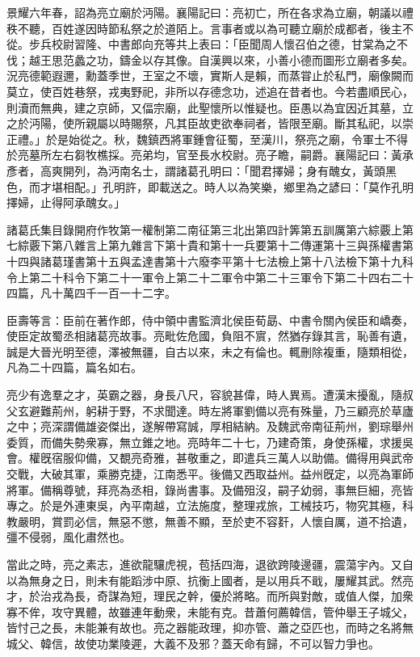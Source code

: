 \begin{pinyinscope}
景耀六年春，詔為亮立廟於沔陽。襄陽記曰：亮初亡，所在各求為立廟，朝議以禮秩不聽，百姓遂因時節私祭之於道陌上。言事者或以為可聽立廟於成都者，後主不從。步兵校尉習隆、中書郎向充等共上表曰：「臣聞周人懷召伯之德，甘棠為之不伐；越王思范蠡之功，鑄金以存其像。自漢興以來，小善小德而圖形立廟者多矣。況亮德範遐邇，勳蓋季世，王室之不壞，實斯人是賴，而蒸甞止於私門，廟像闕而莫立，使百姓巷祭，戎夷野祀，非所以存德念功，述追在昔者也。今若盡順民心，則瀆而無典，建之京師，又偪宗廟，此聖懷所以惟疑也。臣愚以為宜因近其墓，立之於沔陽，使所親屬以時賜祭，凡其臣故吏欲奉祠者，皆限至廟。斷其私祀，以崇正禮。」於是始從之。秋，魏鎮西將軍鍾會征蜀，至漢川，祭亮之廟，令軍士不得於亮墓所左右芻牧樵採。亮弟均，官至長水校尉。亮子瞻，嗣爵。襄陽記曰：黃承彥者，高爽開列，為沔南名士，謂諸葛孔明曰：「聞君擇婦；身有醜女，黃頭黑色，而才堪相配。」孔明許，即載送之。時人以為笑樂，鄉里為之諺曰：「莫作孔明擇婦，止得阿承醜女。」

諸葛氏集目錄開府作牧第一權制第二南征第三北出第四計筭第五訓厲第六綜覈上第七綜覈下第八雜言上第九雜言下第十貴和第十一兵要第十二傳運第十三與孫權書第十四與諸葛瑾書第十五與孟達書第十六廢李平第十七法檢上第十八法檢下第十九科令上第二十科令下第二十一軍令上第二十二軍令中第二十三軍令下第二十四右二十四篇，凡十萬四千一百一十二字。

臣壽等言：臣前在著作郎，侍中領中書監濟北侯臣荀勗、中書令關內侯臣和嶠奏，使臣定故蜀丞相諸葛亮故事。亮毗佐危國，負阻不賔，然猶存錄其言，恥善有遺，誠是大晉光明至德，澤被無疆，自古以來，未之有倫也。輒刪除複重，隨類相從，凡為二十四篇，篇名如右。

亮少有逸羣之才，英霸之器，身長八尺，容貌甚偉，時人異焉。遭漢末擾亂，隨叔父玄避難荊州，躬耕于野，不求聞達。時左將軍劉備以亮有殊量，乃三顧亮於草廬之中；亮深謂備雄姿傑出，遂解帶寫誠，厚相結納。及魏武帝南征荊州，劉琮舉州委質，而備失勢衆寡，無立錐之地。亮時年二十七，乃建奇策，身使孫權，求援吳會。權旣宿服仰備，又覩亮奇雅，甚敬重之，即遣兵三萬人以助備。備得用與武帝交戰，大破其軍，乘勝克捷，江南悉平。後備又西取益州。益州旣定，以亮為軍師將軍。備稱尊號，拜亮為丞相，錄尚書事。及備殂沒，嗣子幼弱，事無巨細，亮皆專之。於是外連東吳，內平南越，立法施度，整理戎旅，工械技巧，物究其極，科教嚴明，賞罰必信，無惡不懲，無善不顯，至於吏不容姧，人懷自厲，道不拾遺，彊不侵弱，風化肅然也。

當此之時，亮之素志，進欲龍驤虎視，苞括四海，退欲跨陵邊疆，震蕩宇內。又自以為無身之日，則未有能蹈涉中原、抗衡上國者，是以用兵不戢，屢耀其武。然亮才，於治戎為長，奇謀為短，理民之幹，優於將略。而所與對敵，或值人傑，加衆寡不侔，攻守異體，故雖連年動衆，未能有克。昔蕭何薦韓信，管仲舉王子城父，皆忖己之長，未能兼有故也。亮之器能政理，抑亦管、蕭之亞匹也，而時之名將無城父、韓信，故使功業陵遲，大義不及邪？蓋天命有歸，不可以智力爭也。


\end{pinyinscope}
